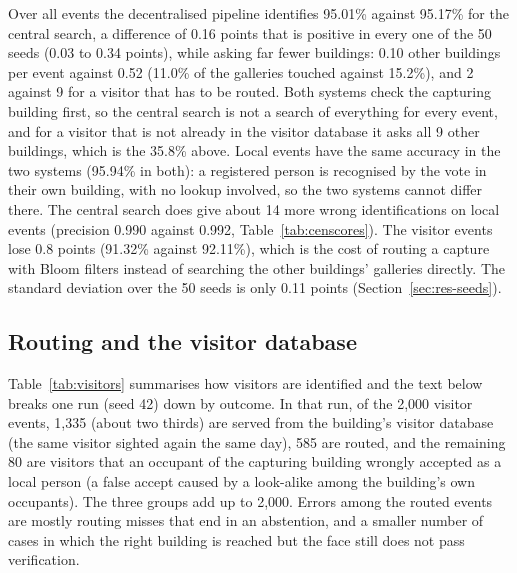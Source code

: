 \documentclass[12pt,a4paper,oneside]{report}
\begin{document}
Over all events the decentralised pipeline identifies 95.01\% against 95.17\% for the central search, a difference of 0.16 points that is positive in every one of the 50 seeds (0.03 to 0.34 points), while asking far fewer buildings: 0.10 other buildings per event against 0.52 (11.0\% of the galleries touched against 15.2\%), and 2 against 9 for a visitor that has to be routed. Both systems check the capturing building first, so the central search is not a search of everything for every event, and for a visitor that is not already in the visitor database it asks all 9 other buildings, which is the 35.8\% above. Local events have the same accuracy in the two systems (95.94\% in both): a registered person is recognised by the vote in their own building, with no lookup involved, so the two systems cannot differ there. The central search does give about 14 more wrong identifications on local events (precision 0.990 against 0.992, Table~\ref{tab:censcores}). The visitor events lose 0.8 points (91.32\% against 92.11\%), which is the cost of routing a capture with Bloom filters instead of searching the other buildings' galleries directly. The standard deviation over the 50 seeds is only 0.11 points (Section~\ref{sec:res-seeds}).

\subsection{Routing and the visitor database}\label{sec:res-visitors}
Table~\ref{tab:visitors} summarises how visitors are identified and the text below breaks one run (seed 42) down by outcome. In that run, of the 2,000 visitor events, 1,335 (about two thirds) are served from the building's visitor database (the same visitor sighted again the same day), 585 are routed, and the remaining 80 are visitors that an occupant of the capturing building wrongly accepted as a local person (a false accept caused by a look-alike among the building's own occupants). The three groups add up to 2,000. Errors among the routed events are mostly routing misses that end in an abstention, and a smaller number of cases in which the right building is reached but the face still does not pass verification.
\end{document}
